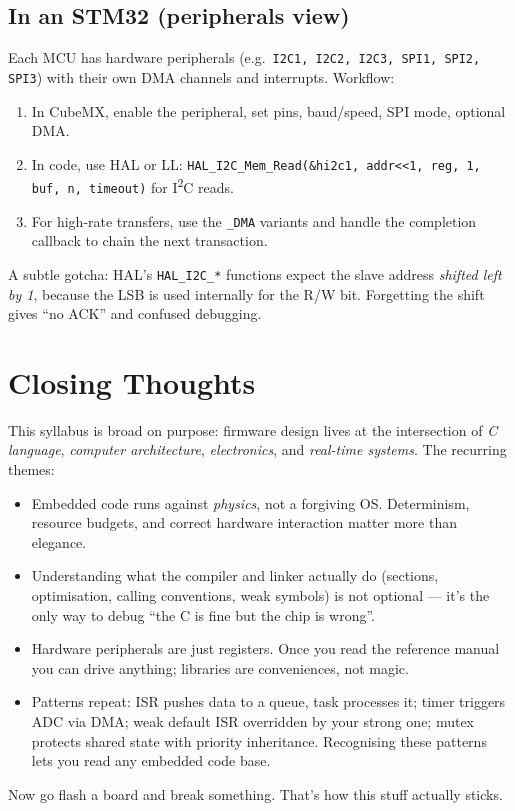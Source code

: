 \documentclass[11pt,a4paper]{article}
\begin{document}
\subsection{In an STM32 (peripherals view)}

Each MCU has hardware peripherals (e.g.\ \texttt{I2C1, I2C2, I2C3,
SPI1, SPI2, SPI3}) with their own DMA channels and interrupts.
Workflow:
\begin{enumerate}[leftmargin=*]
    \item In CubeMX, enable the peripheral, set pins, baud/speed, SPI
    mode, optional DMA.
    \item In code, use HAL or LL: \texttt{HAL\_I2C\_Mem\_Read(\&hi2c1,
    addr<<1, reg, 1, buf, n, timeout)} for I\textsuperscript{2}C reads.
    \item For high-rate transfers, use the \texttt{\_DMA} variants and
    handle the completion callback to chain the next transaction.
\end{enumerate}

\begin{note}
A subtle gotcha: HAL's \texttt{HAL\_I2C\_*} functions expect the slave
address \emph{shifted left by 1}, because the LSB is used internally for
the R/W bit. Forgetting the shift gives ``no ACK'' and confused debugging.
\end{note}

\section*{Closing Thoughts}

This syllabus is broad on purpose: firmware design lives at the
intersection of \emph{C language}, \emph{computer architecture},
\emph{electronics}, and \emph{real-time systems}. The recurring themes:

\begin{itemize}[leftmargin=*]
    \item Embedded code runs against \emph{physics}, not a forgiving OS.
    Determinism, resource budgets, and correct hardware interaction
    matter more than elegance.
    \item Understanding what the compiler and linker actually do
    (sections, optimisation, calling conventions, weak symbols) is not
    optional --- it's the only way to debug ``the C is fine but the chip
    is wrong''.
    \item Hardware peripherals are just registers. Once you read the
    reference manual you can drive anything; libraries are conveniences,
    not magic.
    \item Patterns repeat: ISR pushes data to a queue, task processes it;
    timer triggers ADC via DMA; weak default ISR overridden by your
    strong one; mutex protects shared state with priority inheritance.
    Recognising these patterns lets you read any embedded code base.
\end{itemize}

Now go flash a board and break something. That's how this stuff actually
sticks.
\end{document}
